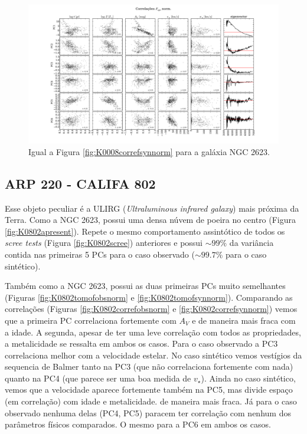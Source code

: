 \begin{figure}
    \includegraphics[width=1.3\textwidth, angle=-90]{figuras/K0213-correl-f_syn_norm-PCvsPhys.pdf}
	\caption[Correlações PCs vs. par\^ametros f\'isicos - $F_{syn}$ norm. - NGC 2623.]
	{Igual a Figura \ref{fig:K0008correfsynnorm} para a galáxia NGC 2623.}
    \label{fig:K0213correfsynnorm}
\end{figure}

\subsection{ARP 220 - CALIFA 802}

Esse objeto peculiar é a ULIRG ({\em Ultraluminous infrared galaxy}) mais próxima da Terra. Como a NGC 2623, possui uma
densa núvem de poeira no centro (Figura \ref{fig:K0802apresent}). Repete o mesmo comportamento assintótico de todos
os {\em scree tests} (Figura \ref{fig:K0802scree}) anteriores e possui $\sim 99\%$ da variância contida nas primeiras 5
PCs para o caso observado ($\sim 99.7\%$ para o caso sintético).

Também como a NGC 2623, possui as duas primeiras PCs muito semelhantes (Figuras \ref{fig:K0802tomofobsnorm} e
\ref{fig:K0802tomofsynnorm}). Comparando as correlações (Figuras \ref{fig:K0802correfobsnorm} e
\ref{fig:K0802correfsynnorm}) vemos que a primeira PC correlaciona fortemente com $A_V$ e de maneira mais fraca com a
idade. A segunda, apesar de ter uma leve correlação com todos as propriedades, a metalicidade se ressalta em ambos os
casos. Para o caso observado a PC3 correlaciona melhor com a velocidade estelar. No caso sintético vemos vestígios da
sequencia de Balmer tanto na PC3 (que não correlaciona fortemente com nada) quanto na PC4 (que parece ser uma boa
medida de $v_\star$). Ainda no caso sintético, vemos que a velocidade aparece fortemente também na PC5, mas divide
espaço (em correlação) com idade e metalicidade. de maneira mais fraca. Já para o caso observado nenhuma delas (PC4,
PC5) paracem ter correlação com nenhum dos parâmetros físicos comparados. O mesmo para a PC6 em ambos os casos.

